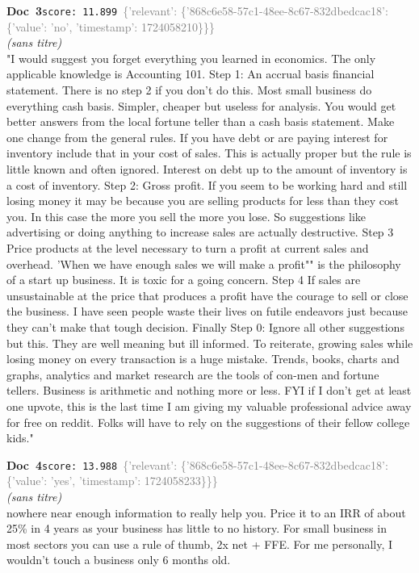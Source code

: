 \documentclass[a4paper,11pt]{article}
\begin{document}
\begin{docenv}
{\footnotesize\textcolor{doccolor}{\textbf{Doc~3}}}\hfill{\tiny\texttt{score:~11.899}}\ {\tiny\textcolor{gray}{\{'relevant': \{'868c6e58-57c1-48ee-8c67-832dbedcac18': \{'value': 'no', 'timestamp': 1724058210\}\}\}}}\\[3pt]
{\small\textit{(sans titre)}}\\[2pt]
\vspace{2pt}
{\footnotesize 
"I would suggest you forget everything you learned in economics. The only applicable knowledge is Accounting 101.  Step 1: An accrual basis financial statement. There is no step 2 if you don't do this. Most small business do everything cash basis. Simpler, cheaper but useless for analysis. You would get better answers from the local fortune teller than a cash basis statement.   Make one change from the general rules. If you have debt or are paying interest for inventory include that in your cost of sales. This is actually proper but the rule is little known and often ignored. Interest on debt up to the amount of inventory is a cost of inventory.  Step 2: Gross profit. If you seem to be working hard and still losing money it may be because you are selling products for less than they cost you. In this case the more you sell the more you lose. So suggestions like advertising or doing anything to increase sales are actually destructive.  Step 3 Price products at the level necessary to turn a profit at current sales and overhead. 'When we have enough sales we will make a profit"" is the philosophy of a start up business. It is toxic for a going concern.  Step 4 If sales are unsustainable at the price that produces a profit have the courage to sell or close the business. I have seen people waste their lives on futile endeavors just because they can't make that tough decision.  Finally Step 0: Ignore all other suggestions but this. They are well meaning but ill informed. To reiterate, growing sales while losing money on every transaction is a huge mistake. Trends, books, charts and graphs, analytics and market research are the tools of con-men and fortune tellers. Business is arithmetic and nothing more or less.  FYI if I don't get at least one upvote, this is the last time I am giving my valuable professional advice away for free on reddit. Folks will have to rely on the suggestions of their fellow college kids."}
\end{docenv}
\begin{docenv}
{\footnotesize\textcolor{doccolor}{\textbf{Doc~4}}}\hfill{\tiny\texttt{score:~13.988}}\ {\tiny\textcolor{gray}{\{'relevant': \{'868c6e58-57c1-48ee-8c67-832dbedcac18': \{'value': 'yes', 'timestamp': 1724058233\}\}\}}}\\[3pt]
{\small\textit{(sans titre)}}\\[2pt]
\vspace{2pt}
{\footnotesize 
nowhere near enough information to really help you.  Price it to an IRR of about 25\% in 4 years as your business has little to no history.  For small business in most sectors you can use a rule of thumb, 2x net + FFE.  For me personally, I wouldn't touch a business only 6 months old.}
\end{docenv}
\end{document}

